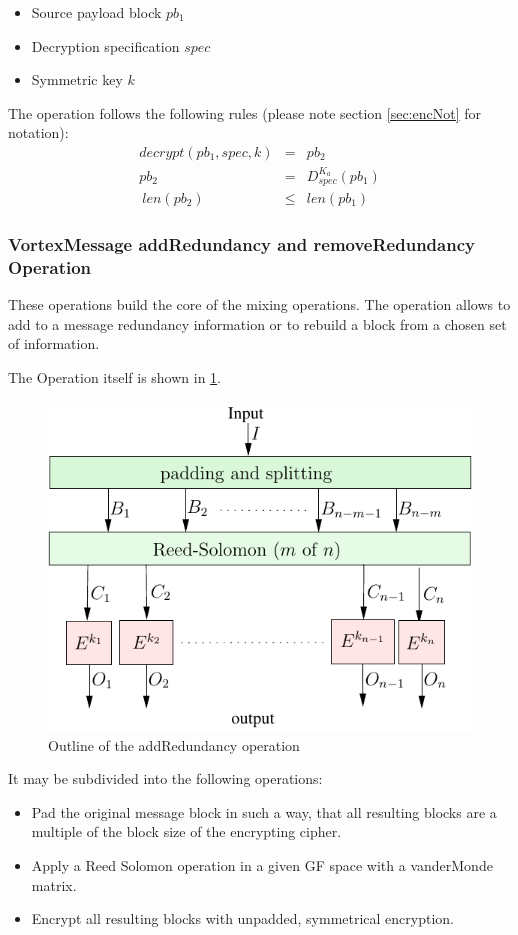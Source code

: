 \begin{itemize}
	\item Source payload block $pb_1$
	\item Decryption specification $spec$
	\item Symmetric key $k$
\end{itemize}

The operation follows the following rules (please note section \ref{sec:encNot} for notation):
\begin{eqnarray}
decrypt(pb_1, spec, k) & = & pb_2 \\
pb_2 & = & D_{spec}^{K_a}\left( pb_1 \right)\\\
len(pb_2) & \leq & len(pb_1)
\end{eqnarray}

\subsubsection{VortexMessage addRedundancy and removeRedundancy Operation}
These operations build the core of the mixing operations. The operation allows to add to a message redundancy information or to rebuild a block from a chosen set of information. 

The Operation itself is shown in \ref{fig:addRedundancyOperation}. 
\begin{figure}[h]
	\includegraphics[width=\columnwidth]{inc/addRedundancyOp}
	\caption{Outline of the addRedundancy operation}
	\label{fig:addRedundancyOperation}
\end{figure}
It may be subdivided into the following operations:
\begin{itemize}
	\item Pad the original message block in such a way, that all resulting blocks are a multiple of the block size of the encrypting cipher.
	\item Apply a Reed Solomon operation in a given GF space with a vanderMonde matrix.
	\item Encrypt all resulting blocks with unpadded, symmetrical encryption.
\end{itemize}


